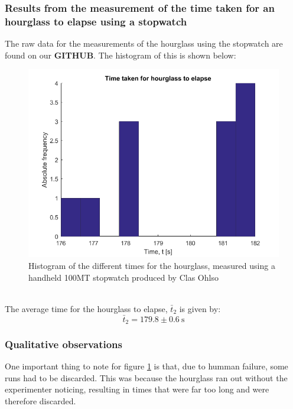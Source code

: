 \documentclass[a4paper, 10pt]{article}
\begin{document}
\subsubsection{Results from the measurement of the time taken for an hourglass to elapse using a stopwatch}
The raw data for the measurements of the hourglass using the stopwatch are found on our \textbf{GITHUB}. The histogram of this is shown below:
\begin{figure}[ht!]
\centering
\includegraphics[scale=0.7]{Experiment2_2.png}
\caption{Histogram of the different times for the hourglass, measured using a handheld 100MT stopwatch produced by Clas Ohlso}\label{fig:Experiment_2_2}
\end{figure}\\
The average time for the hourglass to elapse, $\bar{t}_2$ is given by:
$$\bar{t}_2 = 179.8 \pm 0.6 \ \mathrm{s}$$
\subsubsection{Qualitative observations}\label{Discarding_stopwatch}
One important thing to note for figure \ref{fig:Experiment_2_2} is that, due to humman failure, some runs had to be discarded. This was because the hourglass ran out without the experimenter noticing, resulting in times that were far too long and were therefore discarded.
\end{document}
